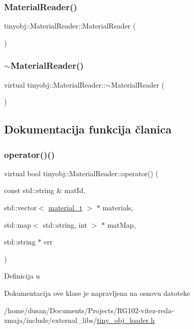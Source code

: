 \subsubsection{\texorpdfstring{Material\+Reader()}{MaterialReader()}}
{\footnotesize\ttfamily tinyobj\+::\+Material\+Reader\+::\+Material\+Reader (\begin{DoxyParamCaption}{ }\end{DoxyParamCaption})\hspace{0.3cm}{\ttfamily [inline]}}

\mbox{\label{classtinyobj_1_1MaterialReader_afd62ceccd9b373801226e037ea1a5f9f}} 
\subsubsection{\texorpdfstring{$\sim$\+Material\+Reader()}{~MaterialReader()}}
{\footnotesize\ttfamily virtual tinyobj\+::\+Material\+Reader\+::$\sim$\+Material\+Reader (\begin{DoxyParamCaption}{ }\end{DoxyParamCaption})\hspace{0.3cm}{\ttfamily [virtual]}}



\subsection{Dokumentacija funkcija članica}
\mbox{\label{classtinyobj_1_1MaterialReader_ad165d8cc1bd989f8548a9258b0881a89}} 
\subsubsection{\texorpdfstring{operator()()}{operator()()}}
{\footnotesize\ttfamily virtual bool tinyobj\+::\+Material\+Reader\+::operator() (\begin{DoxyParamCaption}\item[{const std\+::string \&}]{mat\+Id,  }\item[{std\+::vector$<$ \hyperlink{structtinyobj_1_1material__t}{material\+\_\+t} $>$ $\ast$}]{materials,  }\item[{std\+::map$<$ std\+::string, int $>$ $\ast$}]{mat\+Map,  }\item[{std\+::string $\ast$}]{err }\end{DoxyParamCaption})\hspace{0.3cm}{\ttfamily [pure virtual]}}



Definicija u 



Dokumentacija ove klase je napravljena na osnovu datoteke \begin{DoxyCompactItemize}
\item 
/home/dusan/\+Documents/\+Projects/\+R\+G102-\/vitez-\/reda-\/zmaja/include/external\+\_\+libs/\hyperlink{tiny__obj__loader_8h}{tiny\+\_\+obj\+\_\+loader.\+h}\end{DoxyCompactItemize}
